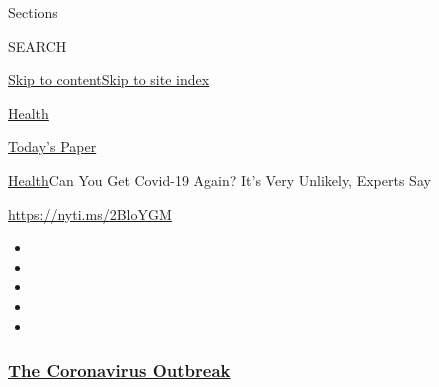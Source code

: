 Sections

SEARCH

\protect\hyperlink{site-content}{Skip to
content}\protect\hyperlink{site-index}{Skip to site index}

\href{https://www.nytimes3xbfgragh.onion/section/health}{Health}

\href{https://myaccount.nytimes3xbfgragh.onion/auth/login?response_type=cookie\&client_id=vi}{}

\href{https://www.nytimes3xbfgragh.onion/section/todayspaper}{Today's
Paper}

\href{/section/health}{Health}\textbar{}Can You Get Covid-19 Again? It's
Very Unlikely, Experts Say

\url{https://nyti.ms/2BloYGM}

\begin{itemize}
\item
\item
\item
\item
\item
\end{itemize}

\hypertarget{the-coronavirus-outbreak}{%
\subsubsection{\texorpdfstring{\href{https://www.nytimes3xbfgragh.onion/news-event/coronavirus?name=styln-coronavirus-national\&region=TOP_BANNER\&variant=undefined\&block=storyline_menu_recirc\&action=click\&pgtype=Article\&impression_id=05d9e0f0-e3a7-11ea-a0fd-ad25549458e4}{The
Coronavirus
Outbreak}}{The Coronavirus Outbreak}}\label{the-coronavirus-outbreak}}

